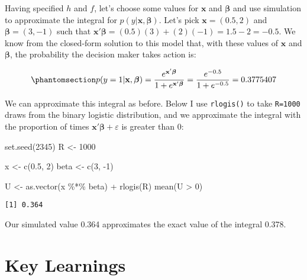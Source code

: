 \documentclass[
  letterpaper,
  DIV=11,
  numbers=noendperiod]{scrreprt}
\newenvironment{Shaded}{\begin{snugshade}}{\end{snugshade}}
\newcommand{\DecValTok}[1]{\textcolor[rgb]{0.68,0.00,0.00}{#1}}
\newcommand{\FloatTok}[1]{\textcolor[rgb]{0.68,0.00,0.00}{#1}}
\newcommand{\FunctionTok}[1]{\textcolor[rgb]{0.28,0.35,0.67}{#1}}
\newcommand{\NormalTok}[1]{\textcolor[rgb]{0.00,0.23,0.31}{#1}}
\newcommand{\OtherTok}[1]{\textcolor[rgb]{0.00,0.23,0.31}{#1}}
\newcommand{\SpecialCharTok}[1]{\textcolor[rgb]{0.37,0.37,0.37}{#1}}
\begin{document}
Having specified \(h\) and \(f\), let's choose some values for
\(\mathbf{x}\) and \(\boldsymbol{\beta}\) and use simulation to
approximate the integral for \(p(y|\mathbf{x},\boldsymbol{\beta})\).
Let's pick \(\mathbf{x}=(0.5, 2)\) and \(\boldsymbol{\beta}=(3,-1)\)
such that
\(\mathbf{x}'\boldsymbol{\beta}= (0.5)(3)+(2)(-1) = 1.5 - 2 = -0.5\). We
know from the closed-form solution to this model that, with these values
of \(\mathbf{x}\) and \(\boldsymbol{\beta}\), the probability the
decision maker takes action is:

\begin{equation}\phantomsection\label{eq-binlogit_example}{
p(y=1 | \mathbf{x}, \boldsymbol{\beta}) = \frac{e^{\mathbf{x}'\boldsymbol{\beta}}}{1 + e^{\mathbf{x}'\boldsymbol{\beta}}} = \frac{e^{-0.5}}{1+e^{-0.5}} = 0.3775407
}\end{equation}

We can approximate this integral as before. Below I use
\texttt{rlogis()} to take \texttt{R=1000} draws from the binary logistic
distribution, and we approximate the integral with the proportion of
times \(\mathbf{x}'\boldsymbol{\beta}+ \varepsilon\) is greater than
\(0\):

\begin{Shaded}
\begin{Highlighting}[]
\FunctionTok{set.seed}\NormalTok{(}\DecValTok{2345}\NormalTok{)}
\NormalTok{R }\OtherTok{\textless{}{-}} \DecValTok{1000}

\NormalTok{x    }\OtherTok{\textless{}{-}} \FunctionTok{c}\NormalTok{(}\FloatTok{0.5}\NormalTok{, }\DecValTok{2}\NormalTok{)}
\NormalTok{beta }\OtherTok{\textless{}{-}} \FunctionTok{c}\NormalTok{(}\DecValTok{3}\NormalTok{, }\SpecialCharTok{{-}}\DecValTok{1}\NormalTok{)}

\NormalTok{U }\OtherTok{\textless{}{-}} \FunctionTok{as.vector}\NormalTok{(x }\SpecialCharTok{\%*\%}\NormalTok{ beta) }\SpecialCharTok{+} \FunctionTok{rlogis}\NormalTok{(R)}
\FunctionTok{mean}\NormalTok{(U }\SpecialCharTok{\textgreater{}} \DecValTok{0}\NormalTok{)}
\end{Highlighting}
\end{Shaded}

\begin{verbatim}
[1] 0.364
\end{verbatim}

Our simulated value 0.364 approximates the exact value of the integral
0.378.

\section{Key Learnings}\label{key-learnings}
\end{document}
